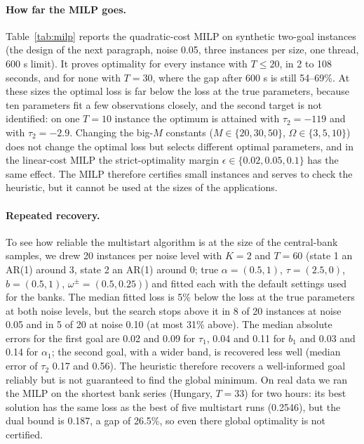 \documentclass[11pt,a4paper]{article}
\theoremstyle{remark}\newtheorem{remark}{Remark}
\begin{document}
\paragraph{How far the MILP goes.} Table~\ref{tab:milp} reports the quadratic-cost MILP on synthetic two-goal instances (the design of the next paragraph, noise 0.05, three instances per size, one thread, 600 s limit). It proves optimality for every instance with $T\le20$, in 2 to 108 seconds, and for none with $T=30$, where the gap after 600 s is still 54--69\%. At these sizes the optimal loss is far below the loss at the true parameters, because ten parameters fit a few observations closely, and the second target is not identified: on one $T=10$ instance the optimum is attained with $\tau_2=-119$ and with $\tau_2=-2.9$. Changing the big-$M$ constants ($M\in\{20,30,50\}$, $\Omega\in\{3,5,10\}$) does not change the optimal loss but selects different optimal parameters, and in the linear-cost MILP the strict-optimality margin $\epsilon\in\{0.02,0.05,0.1\}$ has the same effect. The MILP therefore certifies small instances and serves to check the heuristic, but it cannot be used at the sizes of the applications.
\begin{table}[t]\centering\small
\caption{Quadratic-cost MILP on synthetic two-goal instances (noise 0.05, three instances per $T$, 600 s limit). Gap: relative gap between incumbent and dual bound at termination.}\label{tab:milp}\end{table}
\paragraph{Repeated recovery.} To see how reliable the multistart algorithm is at the size of the central-bank samples, we drew 20 instances per noise level with $K=2$ and $T=60$ (state 1 an AR(1) around 3, state 2 an AR(1) around 0; true $\alpha=(0.5,1)$, $\tau=(2.5,0)$, $b=(0.5,1)$, $\omega^\pm=(0.5,0.25)$) and fitted each with the default settings used for the banks. The median fitted loss is 5\% below the loss at the true parameters at both noise levels, but the search stops above it in 8 of 20 instances at noise 0.05 and in 5 of 20 at noise 0.10 (at most 31\% above). The median absolute errors for the first goal are 0.02 and 0.09 for $\tau_1$, 0.04 and 0.11 for $b_1$ and 0.03 and 0.14 for $\alpha_1$; the second goal, with a wider band, is recovered less well (median error of $\tau_2$ 0.17 and 0.56). The heuristic therefore recovers a well-informed goal reliably but is not guaranteed to find the global minimum. On real data we ran the MILP on the shortest bank series (Hungary, $T=33$) for two hours: its best solution has the same loss as the best of five multistart runs (0.2546), but the dual bound is 0.187, a gap of 26.5\%, so even there global optimality is not certified.
\end{document}
